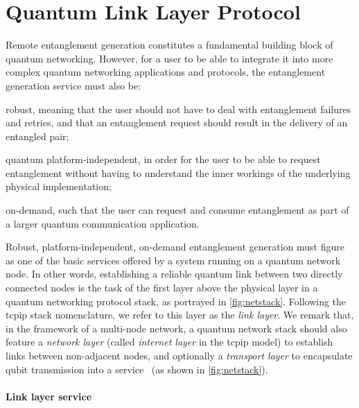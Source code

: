 \section{Quantum Link Layer Protocol}
\label{sec:netstack:link}

Remote entanglement generation constitutes a fundamental building block of quantum networking.
However, for a user to be able to integrate it into more complex quantum networking applications and
protocols, the entanglement generation service must also be:
%
\begin{inlinelist}
    \item robust, meaning that the user should not have to deal with entanglement failures and
          retries, and that an entanglement request should result in the delivery of an entangled
          pair;
    \item quantum platform-independent, in order for the user to be able to request entanglement
          without having to understand the inner workings of the underlying physical implementation;
    \item on-demand, such that the user can request and consume entanglement as part of a larger
          quantum communication application.
\end{inlinelist}
Robust, platform-independent, on-demand entanglement generation must figure as one of the basic
services offered by a system running on a quantum network node. In other words, establishing a
reliable quantum link between two directly connected nodes is the task of the first layer above the
physical layer in a quantum networking protocol stack, as portrayed in \cref{fig:netstack}.
Following the \acrshort{tcpip} stack nomenclature, we refer to this layer as the \emph{link layer}.
We remark that, in the framework of a multi-node network, a quantum network stack should also
feature a \emph{network layer} (called \emph{internet layer} in the \acrshort{tcpip} model) to
establish links between non-adjacent nodes, and optionally a \emph{transport layer} to encapsulate
qubit transmission into a service~\cite{dahlberg_2019_egp, kozlowski_2020_qnp, pirker_2019_quantum}
(as shown in \cref{fig:netstack}).

\paragraph{Link layer service}

